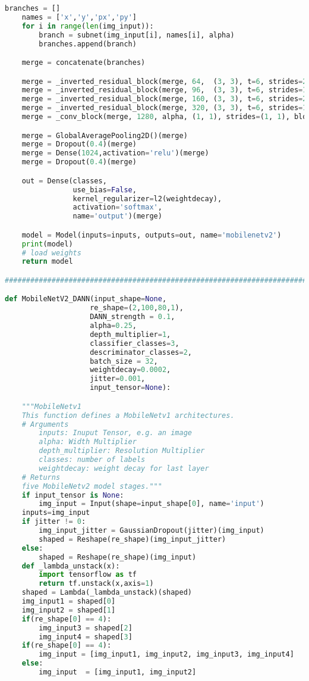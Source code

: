 \begin{lstlisting}[language=Python]
    branches = []
    names = ['x','y','px','py']
    for i in range(len(img_input)):
        branch = subnet(img_input[i], names[i], alpha)
        branches.append(branch)

    merge = concatenate(branches)

    merge = _inverted_residual_block(merge, 64,  (3, 3), t=6, strides=2, n=4, alpha=alpha, block_id=7, name='merge')
    merge = _inverted_residual_block(merge, 96,  (3, 3), t=6, strides=1, n=3, alpha=alpha, block_id=11, name='merge')
    merge = _inverted_residual_block(merge, 160, (3, 3), t=6, strides=2, n=3, alpha=alpha, block_id=14, name='merge')
    merge = _inverted_residual_block(merge, 320, (3, 3), t=6, strides=1, n=1, alpha=alpha, block_id=17, name='merge')
    merge = _conv_block(merge, 1280, alpha, (1, 1), strides=(1, 1), block_id=18, name='merge')

    merge = GlobalAveragePooling2D()(merge)
    merge = Dropout(0.4)(merge)
    merge = Dense(1024,activation='relu')(merge)
    merge = Dropout(0.4)(merge)

    out = Dense(classes,
                use_bias=False,
                kernel_regularizer=l2(weightdecay),
                activation='softmax',
                name='output')(merge)

    model = Model(inputs=inputs, outputs=out, name='mobilenetv2')
    print(model)
    # load weights
    return model

#############################################################################

def MobileNetV2_DANN(input_shape=None,
                    re_shape=(2,100,80,1),
                    DANN_strength = 0.1,
                    alpha=0.25,
                    depth_multiplier=1,
                    classifier_classes=3,
                    descriminator_classes=2,
                    batch_size = 32,
                    weightdecay=0.0002,
                    jitter=0.001,
                    input_tensor=None):

    """MobileNetv1
    This function defines a MobileNetv1 architectures.
    # Arguments
        inputs: Inuput Tensor, e.g. an image
        alpha: Width Multiplier
        depth_multiplier: Resolution Multiplier
        classes: number of labels
        weightdecay: weight decay for last layer
    # Returns
	five MobileNetv2 model stages."""
    if input_tensor is None:
        img_input = Input(shape=input_shape[0], name='input')
    inputs=img_input
    if jitter != 0:
        img_input_jitter = GaussianDropout(jitter)(img_input)
        shaped = Reshape(re_shape)(img_input_jitter)
    else:
        shaped = Reshape(re_shape)(img_input)
    def _lambda_unstack(x):
        import tensorflow as tf
        return tf.unstack(x,axis=1)
    shaped = Lambda(_lambda_unstack)(shaped)
    img_input1 = shaped[0]
    img_input2 = shaped[1]
    if(re_shape[0] == 4):
        img_input3 = shaped[2]
        img_input4 = shaped[3]
    if(re_shape[0] == 4):
        img_input = [img_input1, img_input2, img_input3, img_input4]
    else:
        img_input  = [img_input1, img_input2]


\end{lstlisting}
